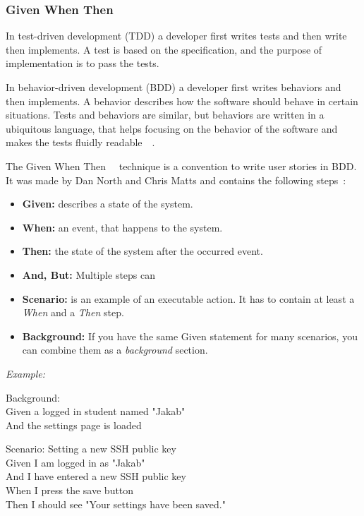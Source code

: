 \subsubsection{Given When Then}
In test-driven development (TDD) a developer first writes tests and then write then implements. A test is based on the specification, and the purpose of implementation is to pass the tests. 

In behavior-driven development (BDD) a developer first writes behaviors and then implements. A behavior describes how the software should behave in certain situations. Tests and behaviors are similar, but behaviors are written in a ubiquitous language, that helps focusing on the behavior of the software and makes the tests fluidly readable~\cite{given-when-then-article2}~\cite{given-when-then-article3}. 

The Given When Then~\cite{given-when-then-cucumber}~\cite{given-when-then-article} technique is a convention to write user stories in BDD. It was made by Dan North and Chris Matts and contains the following steps~\cite{Cucumber-scenario}:

\begin{itemize}
	\item \textbf{Given:} describes a state of the system.
	\item \textbf{When:} an event, that happens to the system.
	\item \textbf{Then:} the state of the system after the occurred event.
	\item \textbf{And, But:} Multiple steps can
	\item \textbf{Scenario:} is an example of an executable action. It has to contain at least a \emph{When} and a \emph{Then} step.
	\item \textbf{Background:} If you have the same Given statement for many scenarios, you can combine them as a \emph{background} section.
\end{itemize} 

\emph{Example:}

Background:\\ \hspace*{1cm}
Given a logged in student named "Jakab"\\ \hspace*{1cm}
And the settings page is loaded

Scenario: Setting a new SSH public key\\ \hspace*{1cm}
Given I am logged in as "Jakab"\\ \hspace*{1cm}
And I have entered a new SSH public key\\ \hspace*{1cm}
When I press the save button\\ \hspace*{1cm}
Then I should see "Your settings have been saved."

